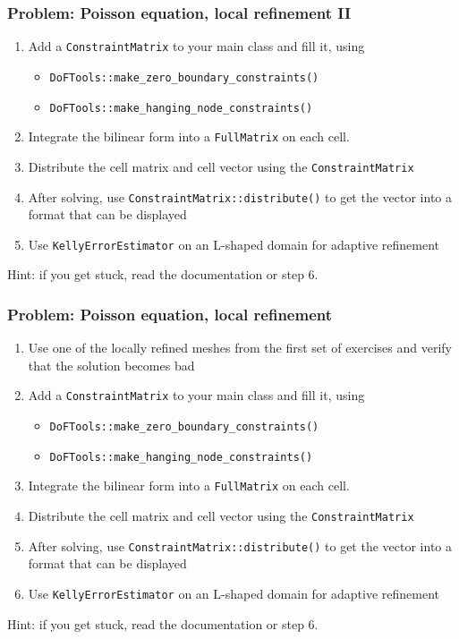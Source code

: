 \begin{frame}
  \frametitle{Problem: Poisson equation, local refinement II}
  \begin{enumerate}
  \item Add a \lstinline!ConstraintMatrix! to your main class and fill it, using
    \begin{itemize}
    \item \lstinline!DoFTools::make_zero_boundary_constraints()!
    \item \lstinline!DoFTools::make_hanging_node_constraints()!
    \end{itemize}
  \item Integrate the bilinear form into a \lstinline!FullMatrix! on
    each cell.
  \item Distribute the cell matrix and cell vector using the
    \lstinline!ConstraintMatrix!
  \item After solving, use \lstinline!ConstraintMatrix::distribute()!
    to get the vector into a format that can be displayed
  \item Use \lstinline!KellyErrorEstimator! on an L-shaped domain for
    adaptive refinement
  \end{enumerate}
Hint: if you get stuck, read the documentation or step 6.
\end{frame}

\begin{frame}
  \frametitle{Problem: Poisson equation, local refinement}
  \begin{enumerate}
  \item Use one of the locally refined meshes from the first set of
    exercises and verify that the solution becomes bad
  \item Add a \lstinline!ConstraintMatrix! to your main class and fill it, using
    \begin{itemize}
    \item \lstinline!DoFTools::make_zero_boundary_constraints()!
    \item \lstinline!DoFTools::make_hanging_node_constraints()!
    \end{itemize}
  \item Integrate the bilinear form into a \lstinline!FullMatrix! on
    each cell.
  \item Distribute the cell matrix and cell vector using the
    \lstinline!ConstraintMatrix!
  \item After solving, use \lstinline!ConstraintMatrix::distribute()!
    to get the vector into a format that can be displayed
  \item Use \lstinline!KellyErrorEstimator! on an L-shaped domain for
    adaptive refinement
  \end{enumerate}
Hint: if you get stuck, read the documentation or step 6.
\end{frame}
